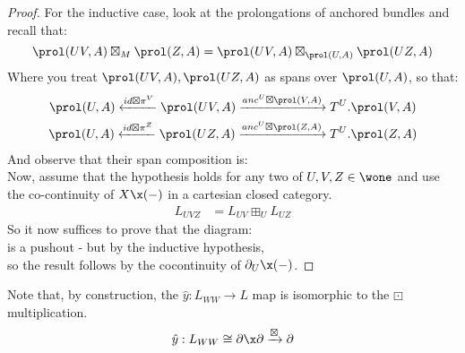 \begin{proof}
	For the inductive case, look at the prolongations of anchored bundles and recall that:
	\[
		\prol(UV,A) \boxtimes_M \prol(Z,A)  =
		\prol(UV,A) \boxtimes_{\prol(U,A)} \prol(UZ,A)
	\]
	Where you treat $\prol(UV,A), \prol(UZ,A)$ as spans over $\prol(U,A)$, so that:
	\begin{gather*}
		\prol(U,A) \xleftarrow[]{id \boxtimes \pi^V} \prol(UV,A) \xrightarrow[]{anc^U \boxtimes \prol(V,A)} T^U.\prol(V,A)\\
		\prol(U,A) \xleftarrow[]{id \boxtimes \pi^Z} \prol(UZ,A) \xrightarrow[]{anc^U \boxtimes \prol(Z,A)} T^U.\prol(Z,A)
	\end{gather*}
	And observe that their span composition is:
	\[
		
	\]
	Now, assume that the hypothesis holds for any two of $U, V, Z \in \wone$ and use the co-continuity of $X \x (-)$ in a cartesian closed category.
	\begin{align*}
		L_{UVZ} & = L_{UV} \boxplus_U L_{UZ}
	\end{align*}
	So it now suffices to prove that the diagram:
	\[\]
	is a pushout - but by the inductive hypothesis,
	\[\]
	so the result follows by the cocontinuity of $\partial_U \x (-)$.
\end{proof}
\begin{corollary}%
	\label{cor:rewrite-boxdot}
	Note that, by construction, the $\hat{y}:L_{WW} \to L$ map is isomorphic to the $\boxdot$ multiplication.
	\[
		\hat{y}: L_{WW} \cong \partial \x \partial \xrightarrow[]{\boxtimes} \partial
	\]
\end{corollary}

